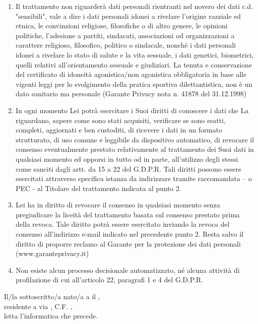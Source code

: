 \documentclass[
	headerstyle = TitleDojoFijlkam
]{djtsmod}
\begin{document}
\begin{enumerate}[wide, labelindent = 0pt, noitemsep, topsep = 0pt]
		\item Il trattamento non riguarderà dati personali rientranti nel novero dei dati c.d. "sensibili", vale a dire i dati personali idonei a rivelare l'origine razziale ed etnica, le convinzioni religiose, filosofiche o di altro genere, le opinioni politiche, l'adesione a partiti, sindacati, associazioni od organizzazioni a carattere religioso, filosofico, politico o sindacale, nonché i dati personali idonei a rivelare lo stato di salute e la vita sessuale, i dati genetici, biometrici, quelli relativi all'orientamento sessuale e giudiziari. La tenuta e conservazione del certificato di idoneità agonistica/non agonistica obbligatoria in base alle vigenti leggi per lo svolgimento della pratica sportiva dilettantistica, non è un dato sanitario ma personale (Garante Privacy nota n. 41878 del 31.12.1998)
		\item In ogni momento Lei potrà esercitare i Suoi diritti di conoscere i dati che La riguardano, sapere come sono stati acquisiti, verificare se sono esatti, completi, aggiornati e ben custoditi, di ricevere i dati in un formato strutturato, di uso comune e leggibile da dispositivo automatico, di revocare il consenso eventualmente prestato relativamente al trattamento dei Suoi dati in qualsiasi momento ed opporsi in tutto od in parte, all'utilizzo degli stessi come sanciti dagli artt. da 15 a 22 del G.D.P.R. Tali diritti possono essere esercitati attraverso specifica istanza da indirizzare tramite raccomandata – o PEC - al Titolare del trattamento indicata al punto 2.
		\item Lei ha in diritto di revocare il consenso in qualsiasi momento senza pregiudicare la liceità del trattamento basata sul consenso prestato prima della revoca. Tale diritto potrà essere esercitato inviando la revoca del consenso all'indirizzo e-mail indicato nel precedente punto 2. Resta salvo il diritto di proporre reclamo al Garante per la protezione dei dati personali (www.garanteprivacy.it)
		\item Non esiste alcun processo decisionale automatizzato, né alcuna attività di profilazione di cui all'articolo 22, paragrafi 1 e 4 del G.D.P.R.
	\end{enumerate}

	\fontsize{9pt}{10pt}\selectfont
	
	Il/la sottoscritto/a \fieldfill\; nato/a a \field{1.5in} il \field{1.5in}, \\ residente a \field{1.5in} via \fieldfill, C.F. \field{2in}, \\
	letta l'informatica che precede.
	
\end{document}
